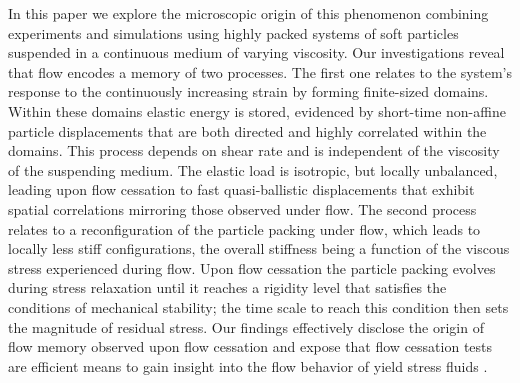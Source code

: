 \documentclass[%
preprint,
 amsmath,amssymb,
 aps,
]{revtex4-1}
\begin{document}
In this paper we explore the microscopic origin of this phenomenon combining experiments and simulations using highly packed systems of soft particles suspended in a continuous medium of varying viscosity. Our investigations reveal that flow encodes a memory of two processes. The first one relates to the system's response to the continuously increasing strain by forming finite-sized domains. Within these domains elastic energy is stored, evidenced by short-time non-affine particle displacements that are both directed and highly correlated within the domains. This process depends on shear rate and is independent of the viscosity of the suspending medium. The elastic load is isotropic, but locally unbalanced, leading upon flow cessation to fast quasi-ballistic displacements that exhibit spatial correlations mirroring those observed under flow. The second process relates
to a reconfiguration of the particle packing under flow, which leads to locally less stiff 
configurations, the overall stiffness being a function of the viscous stress experienced during flow. Upon flow cessation the particle packing evolves during stress relaxation until it reaches a rigidity level that satisfies the
conditions of mechanical stability; the time scale to reach this condition then sets the magnitude of residual stress. Our findings effectively disclose the origin of flow memory observed upon flow cessation and expose that flow cessation tests are efficient means to gain insight into the flow behavior of yield stress fluids \cite{nicolas2018deformation,vasisht2018rate,khabaz2020particle,aime2023unified,bandyopadhyay2010stress,barik2022origin,ballauff2013residual,bhattacharyya2023nature}.
\end{document}
